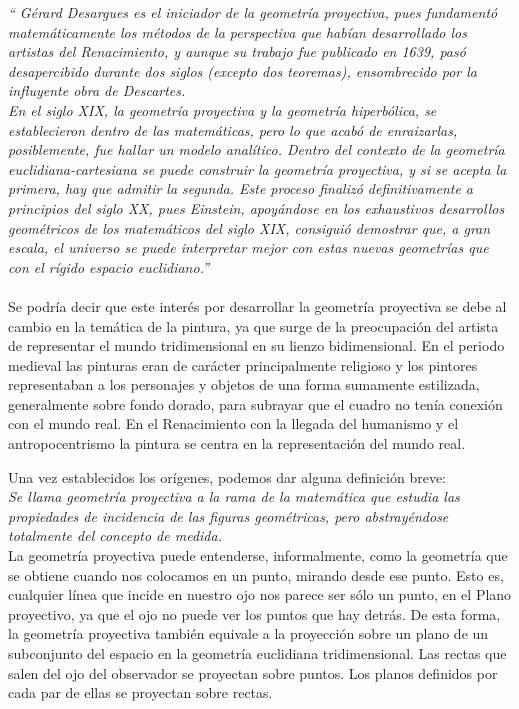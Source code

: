 \documentclass[a4,10pt]{article}
\begin{document}
\emph{“
Gérard Desargues es el iniciador de la geometría proyectiva, pues fundamentó matemáticamente los métodos de la perspectiva que habían desarrollado los artistas del Renacimiento, y aunque su trabajo fue publicado en 1639, pasó desapercibido durante dos siglos (excepto dos teoremas), ensombrecido por la influyente obra de Descartes.\\
En el siglo XIX, la geometría proyectiva y la geometría hiperbólica, se establecieron dentro de las matemáticas, pero lo que acabó de enraizarlas, posiblemente, fue hallar un modelo analítico. Dentro del contexto de la geometría euclidiana-cartesiana se puede construir la geometría proyectiva, y si se acepta la primera, hay que admitir la segunda. Este proceso finalizó definitivamente a principios del siglo XX, pues Einstein, apoyándose en los exhaustivos desarrollos geométricos de los matemáticos del siglo XIX, consiguió demostrar que, a gran escala, el universo se puede interpretar mejor con estas nuevas geometrías que con el rígido espacio euclidiano.”}\\%
\\
Se podría decir que este interés por desarrollar la geometría proyectiva se debe al cambio en la temática de la pintura, ya que surge de la preocupación del artista de representar el mundo tridimensional en su lienzo bidimensional. En el periodo medieval las pinturas eran de carácter principalmente religioso y los pintores representaban a los personajes y objetos de una forma sumamente estilizada, generalmente sobre fondo dorado, para subrayar que el cuadro no tenía conexión con el mundo real. En el Renacimiento con la llegada del humanismo y el antropocentrismo la pintura se centra en la representación del mundo real.

Una vez establecidos los orígenes, podemos dar alguna definición breve:\\
\emph{
Se llama geometría proyectiva a la rama de la matemática que estudia las propiedades de incidencia de las figuras geométricas, pero abstrayéndose totalmente del concepto de medida.}\\

La geometría proyectiva puede entenderse, informalmente, como la geometría que se obtiene cuando nos colocamos en un punto, mirando desde ese punto. Esto es, cualquier línea que incide en nuestro ojo nos parece ser sólo un punto, en el Plano proyectivo, ya que el ojo no puede ver los puntos que hay detrás.
De esta forma, la geometría proyectiva también equivale a la proyección sobre un plano de un subconjunto del espacio en la geometría euclidiana tridimensional. Las rectas que salen del ojo del observador se proyectan sobre puntos. Los planos definidos por cada par de ellas se proyectan sobre rectas.
\end{document}
